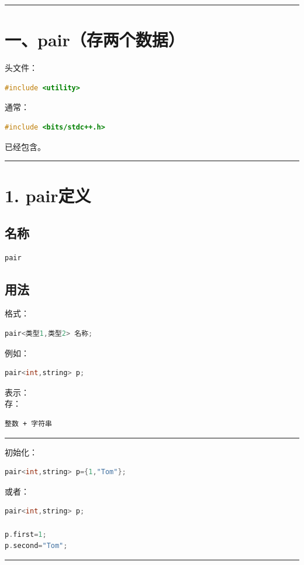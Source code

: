 \documentclass[10pt,twocolumn]{extarticle}
\begin{document}
\noindent\rule{\linewidth}{0.4pt}

\section{一、pair（存两个数据）}

头文件：
\begin{lstlisting}[language=C++]
#include <utility>
\end{lstlisting}
通常：
\begin{lstlisting}[language=C++]
#include <bits/stdc++.h>
\end{lstlisting}
已经包含。

\noindent\rule{\linewidth}{0.4pt}

\section{1. pair定义}

\subsection{名称}
\begin{lstlisting}[language=C++]
pair
\end{lstlisting}

\subsection{用法}
格式：
\begin{lstlisting}[language=C++]
pair<类型1,类型2> 名称;
\end{lstlisting}
例如：
\begin{lstlisting}[language=C++]
pair<int,string> p;
\end{lstlisting}
表示：\\
存：
\begin{lstlisting}
整数 + 字符串
\end{lstlisting}

\noindent\rule{\linewidth}{0.4pt}

初始化：
\begin{lstlisting}[language=C++]
pair<int,string> p={1,"Tom"};
\end{lstlisting}
或者：
\begin{lstlisting}[language=C++]
pair<int,string> p;

p.first=1;
p.second="Tom";
\end{lstlisting}

\noindent\rule{\linewidth}{0.4pt}
\end{document}
